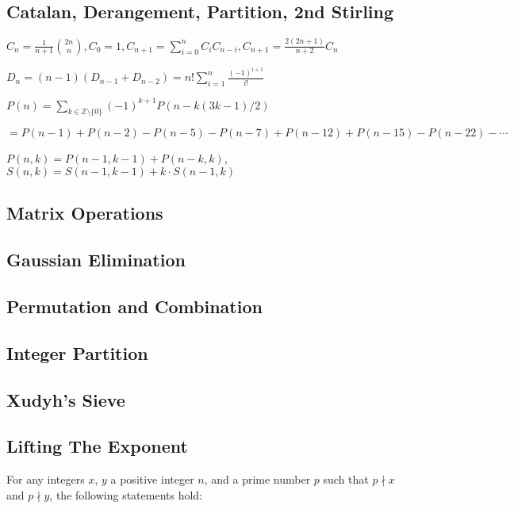 \documentclass[9pt,landscape,a4paper,twocolumn]{extarticle}
\begin{document}
\subsection{Catalan, Derangement, Partition, 2nd Stirling}
$C_n = \frac{1}{n + 1} \binom{2n}{n}, C_0 = 1, C_{n + 1} = \sum_{i=0}^{n} C_i C_{n-i},  C_{n + 1} = \frac{2(2n+1)}{n+2} C_n$

$D_n = (n-1)(D_{n-1} + D_{n-2})=n! \sum_{i=1}^n \frac{(-1)^{i+1}}{i!}$

$ P(n) =\sum_{k \in \mathbb{Z}\setminus\{0\}}^{}
    (-1)^{k+1} P(n-k(3k-1)/2) $

$= P(n-1) + P(n-2)-P(n-5)-P(n-7) +P(n-12) +P(n-15) - P(n-22) -\cdots$

$P(n,k)=P(n-1,k-1)+P(n-k,k)$, $S(n,k)=S(n-1,k-1)+k\cdot S(n-1,k)$

\subsection{Matrix Operations}


\subsection{Gaussian Elimination}


\subsection{Permutation and Combination}



\subsection{Integer Partition}


\subsection{Xudyh's Sieve}


\subsection{Lifting The Exponent}
For any integers $x$, $y$ a positive integer $n$, and a prime number $p$ such that $p \nmid x$ and $p \nmid y$, the following statements hold:
\end{document}
